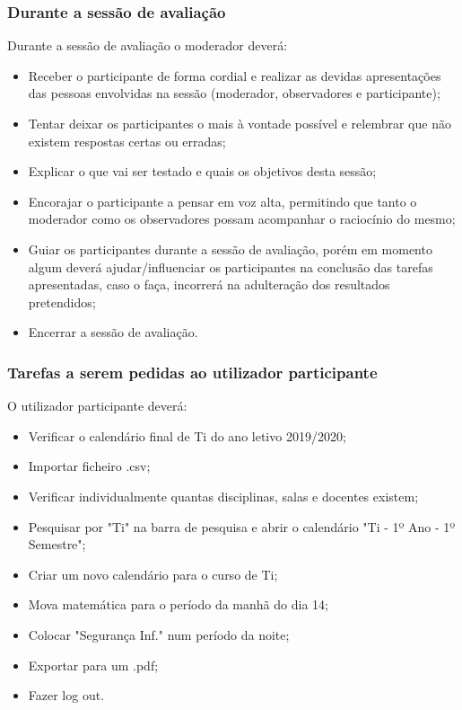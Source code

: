 \documentclass[11pt, twoside]{report}
\begin{document}
	\subsubsection*{Durante a sessão de avaliação}	
	Durante a sessão de avaliação o moderador deverá:
	
	\begin{itemize}
		\item Receber o participante de forma cordial e realizar as devidas apresentações das pessoas envolvidas na sessão (moderador, observadores e participante);
		\item Tentar deixar os participantes o mais à vontade possível e relembrar que não existem respostas certas ou erradas;
		\item Explicar o que vai ser testado e quais os objetivos desta sessão;
		\item Encorajar o participante a pensar em voz alta, permitindo que tanto o moderador como os observadores possam acompanhar o raciocínio do mesmo;
		\item Guiar os participantes durante a sessão de avaliação, porém em momento algum deverá ajudar/influenciar os participantes na conclusão das tarefas apresentadas, caso o faça, incorrerá na adulteração dos resultados pretendidos;
		\item Encerrar a sessão de avaliação.
	\end{itemize}
	
	\subsubsection*{Tarefas a serem pedidas ao utilizador participante}	
	O utilizador participante deverá:
	
	\begin{itemize}
		\item Verificar o calendário final de Ti do ano letivo 2019/2020;
		\item Importar ficheiro .csv;
		\item Verificar individualmente quantas disciplinas, salas e docentes existem;
		\item Pesquisar por "Ti" na barra de pesquisa e abrir o calendário "Ti - 1º Ano - 1º Semestre";
		\item Criar um novo calendário para o curso de Ti;
		\item Mova matemática para o período da manhã do dia 14;
		\item Colocar "Segurança Inf." num período da noite;
		\item Exportar para um .pdf;
		\item Fazer log out.
	\end{itemize}
	
\end{document}
